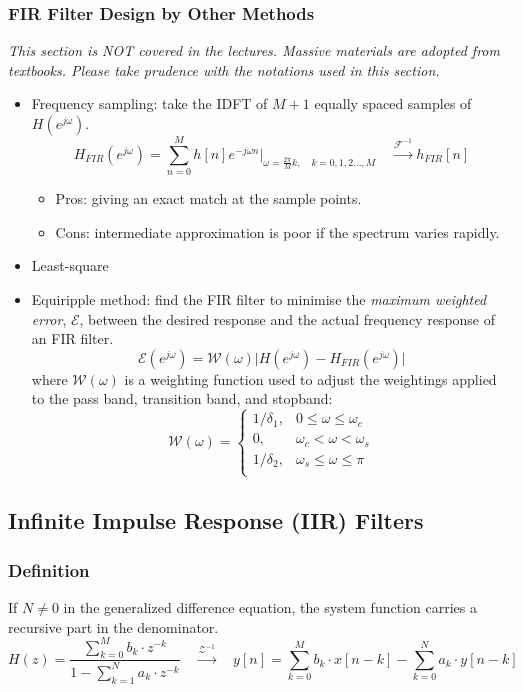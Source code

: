 \subsubsection{FIR Filter Design by Other Methods}
\textit{This section is NOT covered in the lectures. Massive materials are adopted from textbooks. Please take prudence with the notations used in this section.}
\begin{itemize}
    \item Frequency sampling: take the IDFT of $M+1$ equally spaced samples of $H(e^{j\omega})$.
    \[
    H_{FIR}(e^{j\omega})=\sum_{n=0}^{M} h[n]e^{-j\omega n} \bigg\lvert_{\omega = \frac{2\pi}{M}k, \quad k=0, 1, 2..., M} \quad \xrightarrow{\mathcal{F}^{-1}} h_{FIR}[n]
    \]
        \begin{itemize}
            \item Pros: giving an exact match at the sample points.
            \item Cons: intermediate approximation is poor if the spectrum varies rapidly.
        \end{itemize}
    \item Least-square
    \item Equiripple method: find the FIR filter to minimise the \textit{maximum weighted error}, $\mathcal{E}$, between the desired response and the actual frequency response of an FIR filter.
    \[
    \mathcal{E}(e^{j\omega}) = \mathcal{W}(\omega)  \lvert H(e^{j\omega}) - H_{FIR}(e^{j\omega})  \rvert
    \]
    where $\mathcal{W}(\omega)$ is a weighting function used to adjust the weightings applied to the pass band, transition band, and stopband:
    \[
    \mathcal{W}(\omega) = \begin{cases}
        1/\delta_1, & 0 \leq \omega \leq \omega_c\\
        0, & \omega_c < \omega < \omega_{s}\\
        1/\delta_2, & \omega_{s} \leq \omega \leq \pi\\
    \end{cases}
    \]
\end{itemize}


\subsection{Infinite Impulse Response (IIR) Filters}

\subsubsection{Definition}
If $N \neq 0$ in the generalized difference equation, the system function carries a recursive part in the denominator. 
\[
    H(z) = \frac{\sum_{k=0}^{M} b_{k} \cdot z^{-k}}{1 - \sum_{k=1}^{N} a_{k} \cdot z^{-k}} \quad \xrightarrow{\mathcal{Z}^{-1}} \quad y[n] = \sum_{k=0}^{M}b_{k} \cdot x[n-k] - \sum_{k=0}^{N}a_{k} \cdot y[n-k] 
\]

